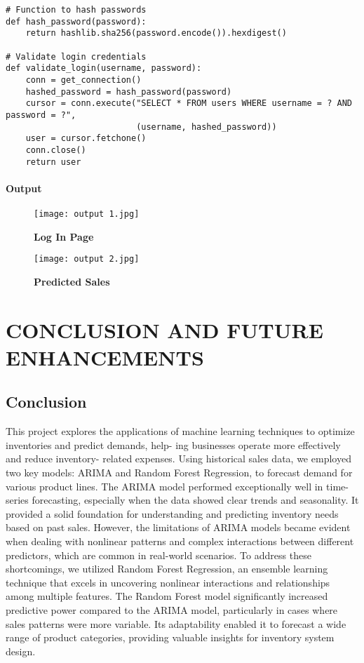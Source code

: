 \documentclass[10pt]{report}
\begin{document}
\begin{center}
\begin{lstlisting}
# Function to hash passwords
def hash_password(password):
    return hashlib.sha256(password.encode()).hexdigest()   

# Validate login credentials
def validate_login(username, password):
    conn = get_connection()
    hashed_password = hash_password(password)
    cursor = conn.execute("SELECT * FROM users WHERE username = ? AND password = ?", 
                          (username, hashed_password))
    user = cursor.fetchone()
    conn.close()
    return user
\end{lstlisting}
\subsubsection{Output}
\begin{figure}[H]
 \centering
 \texttt{[image: output 1.jpg]}
 \caption{\textbf{Log In Page}}
\end{figure}
\begin{figure}[H]
 \centering
 \texttt{[image: output 2.jpg]}
 \caption{\textbf{Predicted Sales}}
\end{figure}
\chapter{CONCLUSION AND FUTURE ENHANCEMENTS}
\linespread{1.5}
\section{Conclusion}
This project explores the applications of machine learning
techniques to optimize inventories and predict demands, help-
ing businesses operate more effectively and reduce inventory-
related expenses. Using historical sales data, we employed
two key models: ARIMA and Random Forest Regression, to
forecast demand for various product lines.
The ARIMA model performed exceptionally well in time-
series forecasting, especially when the data showed clear
trends and seasonality. It provided a solid foundation for
understanding and predicting inventory needs based on past
sales. However, the limitations of ARIMA models became
evident when dealing with nonlinear patterns and complex
interactions between different predictors, which are common
in real-world scenarios.
To address these shortcomings, we utilized Random Forest
Regression, an ensemble learning technique that excels in
uncovering nonlinear interactions and relationships among
multiple features. The Random Forest model significantly
increased predictive power compared to the ARIMA model,
particularly in cases where sales patterns were more variable.
Its adaptability enabled it to forecast a wide range of product
categories, providing valuable insights for inventory system
design.\\


\end{center}
\end{document}
